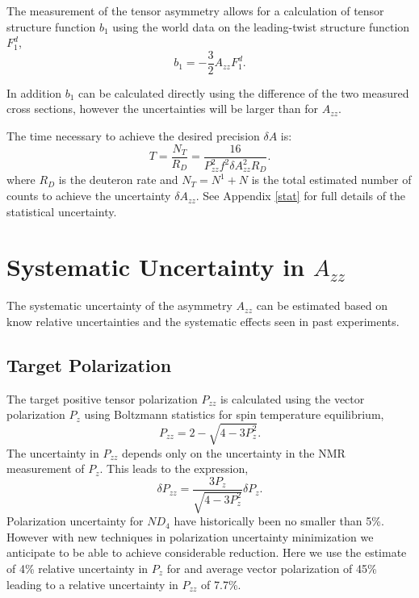 \documentclass[12pt]{article}
\begin{document}
The measurement of the tensor asymmetry allows for a calculation of tensor structure function $b_1$
using the world data on the leading-twist structure function $F_1^d$,
\begin{equation}
b_1=-\frac{3}{2}A_{zz}F_1^d.
\end{equation} 

In addition $b_1$ can be calculated directly using the difference of the two 
measured cross sections, however the uncertainties will be larger 
than for $A_{zz}$.

The time necessary to achieve the desired precision $\delta A$ is:
\begin{equation}
T=\frac{N_T}{R_D}=\frac{16}{P_{zz}^2f^2\delta A_{zz}^2R_D}.
\end{equation} 
where $R_D$ is the deuteron rate and $N_T = N^1 + N$ is the total estimated 
number of counts to achieve the uncertainty $\delta A_{zz}$.  See Appendix
\ref{stat} for full details of the statistical uncertainty.

\section{ Systematic Uncertainty in $A_{zz}$ }
The systematic uncertainty of the asymmetry $A_{zz}$ can be estimated based on know relative uncertainties and 
the systematic effects seen in past experiments.  

\subsection{ Target Polarization }
The target positive tensor polarization $P_{zz}$  is calculated using the vector polarization $P_{z}$
using Boltzmann statistics for spin temperature equilibrium,
\begin{equation}
P_{zz}=2-\sqrt{4-3P_z^2}.
\end{equation}
The uncertainty in $P_{zz}$ depends only on the uncertainty in the NMR measurement of $P_z$.
This leads to the expression,
\begin{equation}
\delta P_{zz}=\frac{3P_z}{\sqrt{4-3P_z^2}}\delta P_z.
\end{equation}
Polarization uncertainty for $ND_4$ have historically been no smaller than 5\%.  However with
new techniques in polarization uncertainty minimization we anticipate to be able to achieve
considerable reduction.  Here we use the estimate of 4\% relative uncertainty in $P_z$ for and
average vector polarization of 45\% leading to a relative uncertainty in $P_{zz}$ of 7.7\%.
\end{document}
